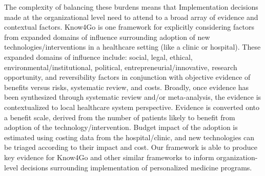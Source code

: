 The complexity of balancing these burdens means that Implementation decisions made at the organizational level need to attend to a broad array of evidence and contextual factors. Know4Go \cite{martin2016hospital} is one framework for explicitly considering factors from expanded domains of influence surrounding adoption of new technologies/interventions in a healthcare setting (like a clinic or hospital). These expanded domains of influence include: social, legal, ethical, environmental/institutional, political, entrepreneurial/innovative, research opportunity, and reversibility factors in conjunction with objective evidence of benefits versus risks, systematic review, and costs.  Broadly, once evidence has been synthesized through systematic review and/or meta-analysis, the evidence is contextualized to local healthcare system perspective.  Evidence is converted onto a benefit scale, derived from the number of patients likely to benefit from adoption of the technology/intervention.  Budget impact of the adoption is estimated using costing data from the hospital/clinic, and new technologies can be triaged according to their impact and cost.  Our framework is able to produce key evidence for Know4Go and other similar frameworks to inform organization-level decisions surrounding implementation of personalized medicine programs.

